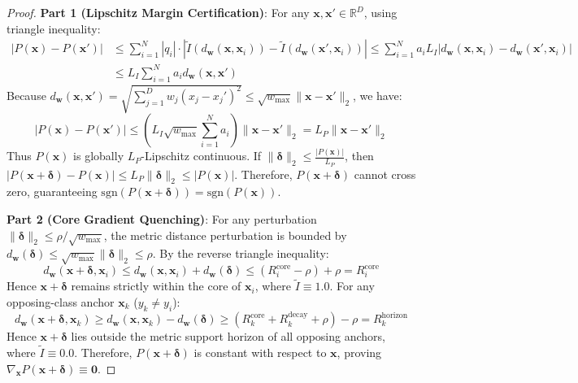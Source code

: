 \documentclass[times, review, 10pt]{elsarticle}
\begin{document}
\begin{proof}
\textbf{Part 1 (Lipschitz Margin Certification)}:
For any $\mathbf{x}, \mathbf{x}' \in \mathbb{R}^D$, using triangle inequality:
\begin{align}
|P(\mathbf{x}) - P(\mathbf{x}')| &\le \sum_{i=1}^N |q_i| \cdot |\tilde{I}(d_{\mathbf{w}}(\mathbf{x}, \mathbf{x}_i)) - \tilde{I}(d_{\mathbf{w}}(\mathbf{x}', \mathbf{x}_i))| \le \sum_{i=1}^N a_i L_I |d_{\mathbf{w}}(\mathbf{x}, \mathbf{x}_i) - d_{\mathbf{w}}(\mathbf{x}', \mathbf{x}_i)| \\
&\le L_I \sum_{i=1}^N a_i d_{\mathbf{w}}(\mathbf{x}, \mathbf{x}')
\end{align}
Because $d_{\mathbf{w}}(\mathbf{x}, \mathbf{x}') = \sqrt{\sum_{j=1}^D w_j (x_j - x_j')^2} \le \sqrt{w_{\max}} \|\mathbf{x} - \mathbf{x}'\|_2$, we have:
\begin{equation}
|P(\mathbf{x}) - P(\mathbf{x}')| \le \left( L_I \sqrt{w_{\max}} \sum_{i=1}^N a_i \right) \|\mathbf{x} - \mathbf{x}'\|_2 = L_P \|\mathbf{x} - \mathbf{x}'\|_2
\end{equation}
Thus $P(\mathbf{x})$ is globally $L_P$-Lipschitz continuous. If $\|\boldsymbol{\delta}\|_2 \le \frac{|P(\mathbf{x})|}{L_P}$, then $|P(\mathbf{x} + \boldsymbol{\delta}) - P(\mathbf{x})| \le L_P \|\boldsymbol{\delta}\|_2 \le |P(\mathbf{x})|$.
Therefore, $P(\mathbf{x} + \boldsymbol{\delta})$ cannot cross zero, guaranteeing $\mathrm{sgn}(P(\mathbf{x} + \boldsymbol{\delta})) = \mathrm{sgn}(P(\mathbf{x}))$.

\textbf{Part 2 (Core Gradient Quenching)}:
For any perturbation $\|\boldsymbol{\delta}\|_2 \le \rho / \sqrt{w_{\max}}$, the metric distance perturbation is bounded by $d_{\mathbf{w}}(\boldsymbol{\delta}) \le \sqrt{w_{\max}} \|\boldsymbol{\delta}\|_2 \le \rho$.
By the reverse triangle inequality:
\begin{equation}
d_{\mathbf{w}}(\mathbf{x} + \boldsymbol{\delta}, \mathbf{x}_i) \le d_{\mathbf{w}}(\mathbf{x}, \mathbf{x}_i) + d_{\mathbf{w}}(\boldsymbol{\delta}) \le (R_i^{\mathrm{core}} - \rho) + \rho = R_i^{\mathrm{core}}
\end{equation}
Hence $\mathbf{x} + \boldsymbol{\delta}$ remains strictly within the core of $\mathbf{x}_i$, where $\tilde{I} \equiv 1.0$.
For any opposing-class anchor $\mathbf{x}_k$ ($y_k \ne y_i$):
\begin{equation}
d_{\mathbf{w}}(\mathbf{x} + \boldsymbol{\delta}, \mathbf{x}_k) \ge d_{\mathbf{w}}(\mathbf{x}, \mathbf{x}_k) - d_{\mathbf{w}}(\boldsymbol{\delta}) \ge (R_k^{\mathrm{core}} + R_k^{\mathrm{decay}} + \rho) - \rho = R_k^{\mathrm{horizon}}
\end{equation}
Hence $\mathbf{x} + \boldsymbol{\delta}$ lies outside the metric support horizon of all opposing anchors, where $\tilde{I} \equiv 0.0$.
Therefore, $P(\mathbf{x} + \boldsymbol{\delta})$ is constant with respect to $\mathbf{x}$, proving $\nabla_{\mathbf{x}} P(\mathbf{x} + \boldsymbol{\delta}) \equiv \mathbf{0}$.
\end{proof}
\end{document}
